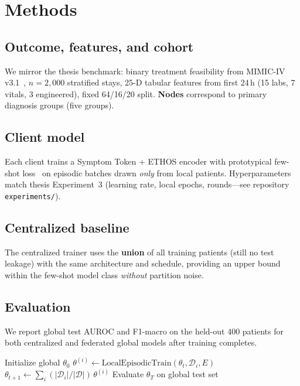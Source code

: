 \section{Methods}
\label{sec:methods}

\subsection{Outcome, features, and cohort}
We mirror the thesis benchmark: binary treatment feasibility from MIMIC-IV v3.1~\citep{johnson2023mimic}, $n{=}2{,}000$ stratified stays, 25-D tabular features from first 24\,h (15 labs, 7 vitals, 3 engineered), fixed 64/16/20 split. \textbf{Nodes} correspond to primary diagnosis groups (five groups).

\subsection{Client model}
Each client trains a Symptom Token + ETHOS encoder with prototypical few-shot loss~\citep{sharafi2023ethos,snell2017prototypical} on episodic batches drawn \emph{only} from local patients. Hyperparameters match thesis Experiment~3 (learning rate, local epochs, rounds---see repository \texttt{experiments/}).

\subsection{Centralized baseline}
The centralized trainer uses the \textbf{union} of all training patients (still no test leakage) with the same architecture and schedule, providing an upper bound within the few-shot model class \emph{without} partition noise.

\subsection{Evaluation}
We report global test AUROC and F1-macro on the held-out 400 patients for both centralized and federated global models after training completes.

\begin{algorithm}[htbp]
\caption{Federated few-shot training (outline)}
\label{alg:fedfs}
\begin{algorithmic}[1]
\State Initialize global $\theta_0$
    \State $\theta^{(i)} \leftarrow \text{LocalEpisodicTrain}(\theta_t, \mathcal{D}_i, E)$
  \EndFor
  \State $\theta_{t+1} \leftarrow \sum_i (|\mathcal{D}_i|/|\mathcal{D}|)\, \theta^{(i)}$
\EndFor
\State Evaluate $\theta_T$ on global test set
\end{algorithmic}
\end{algorithm}

